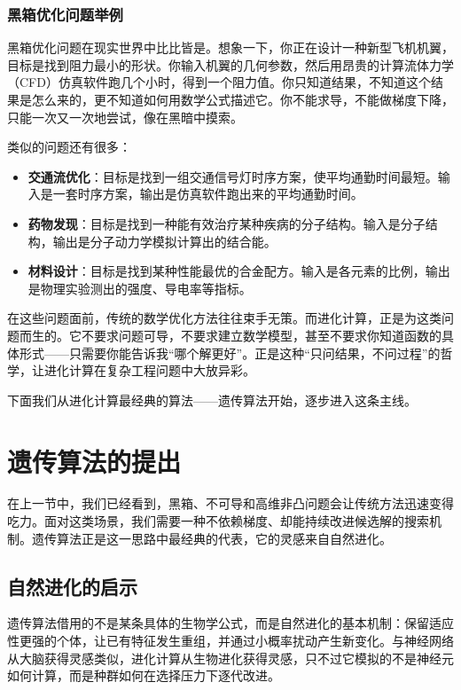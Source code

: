 \documentclass[lang=cn,zihao=-4,a4paper,fontset=windows]{beautybook}
\begin{document}
\subsubsection{黑箱优化问题举例}

黑箱优化问题在现实世界中比比皆是。想象一下，你正在设计一种新型飞机机翼，目标是找到阻力最小的形状。你输入机翼的几何参数，然后用昂贵的计算流体力学（CFD）仿真软件跑几个小时，得到一个阻力值。你只知道结果，不知道这个结果是怎么来的，更不知道如何用数学公式描述它。你不能求导，不能做梯度下降，只能一次又一次地尝试，像在黑暗中摸索。

类似的问题还有很多：

\begin{itemize}
    \item \textbf{交通流优化}：目标是找到一组交通信号灯时序方案，使平均通勤时间最短。输入是一套时序方案，输出是仿真软件跑出来的平均通勤时间。
    \item \textbf{药物发现}：目标是找到一种能有效治疗某种疾病的分子结构。输入是分子结构，输出是分子动力学模拟计算出的结合能。
    \item \textbf{材料设计}：目标是找到某种性能最优的合金配方。输入是各元素的比例，输出是物理实验测出的强度、导电率等指标。
\end{itemize}

在这些问题面前，传统的数学优化方法往往束手无策。而进化计算，正是为这类问题而生的。它不要求问题可导，不要求建立数学模型，甚至不要求你知道函数的具体形式——只需要你能告诉我“哪个解更好”。正是这种“只问结果，不问过程”的哲学，让进化计算在复杂工程问题中大放异彩。

下面我们从进化计算最经典的算法——遗传算法开始，逐步进入这条主线。

\section{遗传算法的提出}

在上一节中，我们已经看到，黑箱、不可导和高维非凸问题会让传统方法迅速变得吃力。面对这类场景，我们需要一种不依赖梯度、却能持续改进候选解的搜索机制。遗传算法正是这一思路中最经典的代表，它的灵感来自自然进化。

\subsection{自然进化的启示}

遗传算法借用的不是某条具体的生物学公式，而是自然进化的基本机制：保留适应性更强的个体，让已有特征发生重组，并通过小概率扰动产生新变化。与神经网络从大脑获得灵感类似，进化计算从生物进化获得灵感，只不过它模拟的不是神经元如何计算，而是种群如何在选择压力下逐代改进。
\end{document}
